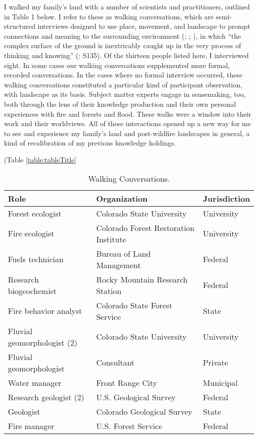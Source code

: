 \documentclass[
]{article}
\begin{document}
I walked my family's land with a number of scientists and practitioners, outlined in Table 1 below. I refer to these as walking conversations, which are semi-structured interviews designed to use place, movement, and landscape to prompt connections and meaning to the surrounding environment (; ; ), in which ``the complex surface of the ground is inextricably caught up in the very process of thinking and knowing'' (: S135). Of the thirteen people listed here, I interviewed eight. In some cases our walking conversations supplemented more formal, recorded conversations. In the cases where no formal interview occurred, these walking conversations constituted a particular kind of participant observation, with landscape as its basis. Subject matter experts engage in sensemaking, too, both through the lens of their knowledge production and their own personal experiences with fire and forests and flood. These walks were a window into their work and their worldviews. All of these interactions opened up a new way for me to see and experience my family's land and post-wildfire landscapes in general, a kind of recalibration of my previous knowledge holdings.

(Table \ref{table:tableTitle}

\captionsetup{width=6.5in}

\begin{table}[!h]
\centering\centering
\caption{\label{tab:IntroTable1}Walking Conversations.}
\centering
\begin{tabu} to 
\toprule
Role & Organization & Jurisdiction\\
\midrule
Forest ecologist & Colorado State University & University\\
Fire ecologist & Colorado Forest Restoration Institute & University\\
Fuels technician & Bureau of Land Management & Federal\\
Research biogeochemist & Rocky Mountain Research Station & Federal\\
Fire behavior analyst & Colorado State Forest Service & State\\
\addlinespace
Fluvial geomorphologist (2) & Colorado State University & University\\
Fluvial geomorphologist & Consultant & Private\\
Water manager & Front Range City & Municipal\\
Research geologist (2) & U.S. Geological Survey & Federal\\
Geologist & Colorado Geological Survey & State\\
\addlinespace
Fire manager & U.S. Forest Service & Federal\\
\bottomrule
\end{tabu}
\end{table}
\end{document}
